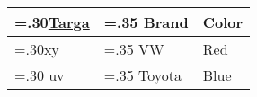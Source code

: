 \documentclass[varwidth=6in]{standalone}
\providecommand\lightrule{%
	\arrayrulecolor{black!30}%
	\midrule[\lightrulewidth]%
	\arrayrulecolor{black}}
\begin{document}
\begin{tabularx}{\textwidth}{ >{\hsize=.30\hsize}X >{\hsize=.35\hsize}X X }
	\toprule
		\underline{Targa} & Brand & Color\\
	\midrule
		xy & VW & Red\\\lightrule
		uv & Toyota & Blue\\
	\bottomrule
\end{tabularx}
\end{document}
